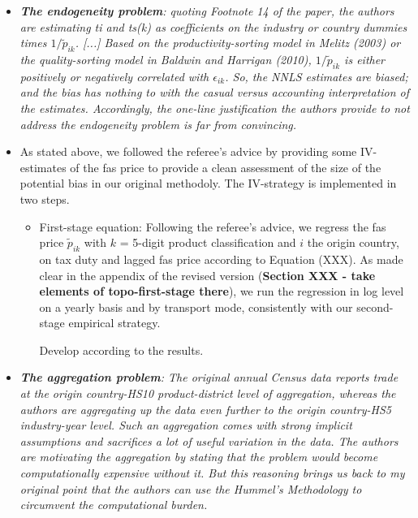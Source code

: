 \documentclass[a4paper,12pt]{article}
\begin{document}
\begin{itemize}
\item \textit{\textbf{The endogeneity problem}: quoting Footnote 14 of the paper, the authors
are estimating ti and ts(k) as coefficients on the industry or country
dummies times $1/\widetilde{p}_{ik}$. [...] Based on the productivity-sorting model in Melitz (2003) or the quality-sorting
model in Baldwin and Harrigan (2010),  $1/\widetilde{p}_{ik}$ is either positively
or negatively correlated with $\epsilon_{ik}$. So, the NNLS estimates are biased; and
the bias has nothing to with the casual versus accounting interpretation of
the estimates. Accordingly, the one-line justification the authors provide
to not address the endogeneity problem is far from convincing.}


\item[\text{Answer}] As stated above, we followed the referee's advice by providing some IV-estimates of the fas price to provide a clean assessment of the size of the potential bias in our original methodoly. The IV-strategy is implemented in two steps.
    \begin{itemize}
    \item First-stage equation: Following the referee's advice, we regress the fas price $\widetilde{p}_{ik}$ with $k$ = 5-digit product classification and $i$ the origin country, on tax duty and lagged fas price according to Equation (XXX). As made clear in the appendix of the revised version (\textbf{Section XXX - take elements of topo-first-stage there}), we run the regression in log level on a yearly basis and by transport mode, consistently with our second-stage empirical strategy. 
        
        
        Develop according to the results.
        
        
    \end{itemize}
    \item \textit{\textbf{The aggregation problem}: The original annual Census data reports
trade at the origin country-HS10 product-district level of aggregation,
whereas the authors are aggregating up the data even further to the origin
country-HS5 industry-year level. Such an aggregation comes with strong implicit assumptions and sacrifices a lot of useful variation in the data.
The authors are motivating the aggregation by stating that the problem
would become computationally expensive without it. But this reasoning
brings us back to my original point that the authors can use the Hummel's
Methodology to circumvent the computational burden.}


\end{itemize}
\end{document}
